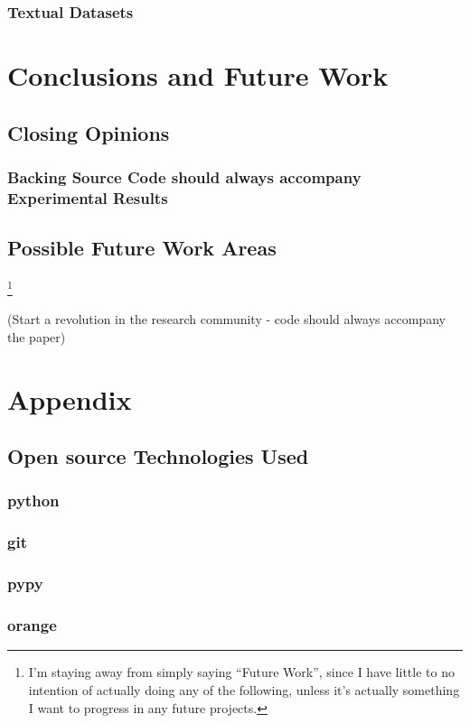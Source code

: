 \documentclass[a4paper,11pt]{report}
\begin{document}
\subsection{Textual Datasets}

\chapter{Conclusions and Future Work}

\section{Closing Opinions}
\subsection{Backing Source Code should always accompany Experimental Results}

\section{Possible Future Work Areas} \footnote{I'm staying away from simply saying ``Future Work'', since I have little to no intention of actually doing any of the following, unless it's actually something I want to progress in any future projects.}



(Start a revolution in the research community - code should always accompany the paper)

\chapter{Appendix}
\section{Open source Technologies Used}
\subsection*{python}
\subsection*{git}
\subsection*{pypy}
\subsection*{orange}
\end{document}

